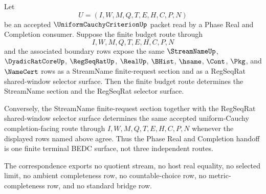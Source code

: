 \begin{theorem}
\label{thm:real-uniform-cauchy-streamname-regseqrat-terminal-route-correspondence}
Let
$$
U=(I,W,M,Q,T,E,H,C,P,N)
$$
be an accepted $\UniformCauchyCriterionUp$ packet read by a Phase Real and
Completion consumer. Suppose the finite budget route through
$$
I,W,M,Q,T,E,H,C,P,N
$$
and the associated boundary rows expose the same $\StreamNameUp$,
$\DyadicRatCoreUp$, $\RegSeqRatUp$, $\RealUp$, $\BHist$, $\hsame$, $\Cont$,
$\Pkg$, and $\NameCert$ rows as a StreamName finite-request section and as a
RegSeqRat shared-window selector surface. Then the finite budget route
determines the StreamName section and the RegSeqRat selector surface.

Conversely, the StreamName finite-request section together with the RegSeqRat
shared-window selector surface determines the same accepted uniform-Cauchy
completion-facing route through $I,W,M,Q,T,E,H,C,P,N$ whenever the displayed
rows named above agree. Thus the Phase Real and Completion handoff is one
finite terminal BEDC surface, not three independent routes.

The correspondence exports no quotient stream, no host real equality, no
selected limit, no ambient completeness row, no countable-choice row, no
metric-completeness row, and no standard bridge row.
\end{theorem}
